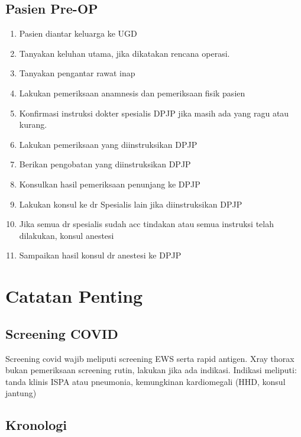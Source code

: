 \documentclass[
]{book}
\providecommand{\tightlist}{%
  \setlength{\itemsep}{0pt}\setlength{\parskip}{0pt}}
\begin{document}
\hypertarget{pasien-pre-op}{%
\section{Pasien Pre-OP}\label{pasien-pre-op}}

\begin{enumerate}
\def\labelenumi{\arabic{enumi}.}
\tightlist
\item
  Pasien diantar keluarga ke UGD
\item
  Tanyakan keluhan utama, jika dikatakan rencana operasi.
\item
  Tanyakan pengantar rawat inap
\item
  Lakukan pemeriksaan anamnesis dan pemeriksaan fisik pasien
\item
  Konfirmasi instruksi dokter spesialis DPJP jika masih ada yang ragu atau kurang.
\item
  Lakukan pemeriksaan yang diinstruksikan DPJP
\item
  Berikan pengobatan yang diinstruksikan DPJP
\item
  Konsulkan hasil pemeriksaan penunjang ke DPJP
\item
  Lakukan konsul ke dr Spesialis lain jika diinstruksikan DPJP
\item
  Jika semua dr spesialis sudah acc tindakan atau semua instruksi telah dilakukan, konsul anestesi
\item
  Sampaikan hasil konsul dr anestesi ke DPJP
\end{enumerate}

\hypertarget{catatan-penting}{%
\chapter{Catatan Penting}\label{catatan-penting}}

\hypertarget{screening-covid}{%
\section{Screening COVID}\label{screening-covid}}

Screening covid wajib meliputi screening EWS serta rapid antigen. Xray thorax bukan pemeriksaan screening rutin, lakukan jika ada indikasi.
Indikasi meliputi: tanda klinis ISPA atau pneumonia, kemungkinan kardiomegali (HHD, konsul jantung)

\hypertarget{kronologi}{%
\section{Kronologi}\label{kronologi}}
\end{document}
